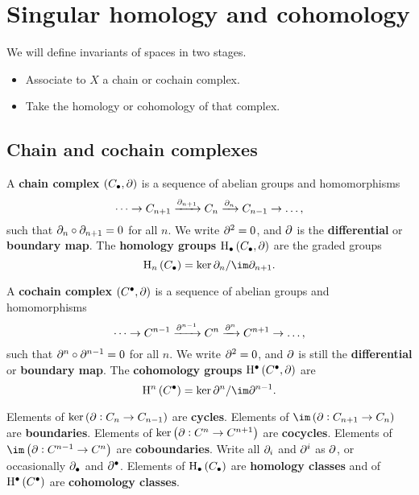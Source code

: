 \pagebreak

\section{Singular homology and cohomology}


We will define invariants of spaces in two stages.
\begin{itemize}
\item Associate to $ X $ a chain or cochain complex.
\item Take the homology or cohomology of that complex.
\end{itemize}

\subsection{Chain and cochain complexes}

\begin{definition*}
A \textbf{chain complex} $ \br{C_\bullet, \da} $ is a sequence of abelian groups and homomorphisms
$$ \dots \to C_{n + 1} \xrightarrow{\partial_{n + 1}} C_n \xrightarrow{\partial_n} C_{n - 1} \to \dots, $$
such that $ \partial_n \circ \partial_{n + 1} = 0 $ for all $ n $. We write $ \partial^2 = 0 $, and $ \partial $ is the \textbf{differential} or \textbf{boundary map}. The \textbf{homology groups} $ \H_\bullet\br{C_\bullet, \da} $ are the graded groups
$$ \H_n\br{C_\bullet} = \ker \da_n / \im \da_{n + 1}. $$
\end{definition*}

\begin{definition*}
A \textbf{cochain complex} $ \br{C^\bullet, \da} $ is a sequence of abelian groups and homomorphisms
$$ \dots \to C^{n - 1} \xrightarrow{\partial^{n - 1}} C^n \xrightarrow{\partial^n} C^{n + 1} \to \dots, $$
such that $ \partial^n \circ \partial^{n - 1} = 0 $ for all $ n $. We write $ \partial^2 = 0 $, and $ \partial $ is still the \textbf{differential} or \textbf{boundary map}. The \textbf{cohomology groups} $ \H^\bullet\br{C^\bullet, \da} $ are
$$ \H^n\br{C^\bullet} = \ker \da^n / \im \da^{n - 1}. $$
\end{definition*}

Elements of $ \ker \br{\da : C_n \to C_{n - 1}} $ are \textbf{cycles}. Elements of $ \im \br{\da : C_{n + 1} \to C_n} $ are \textbf{boundaries}. Elements of $ \ker \br{\da : C^n \to C^{n + 1}} $ are \textbf{cocycles}. Elements of $ \im \br{\da : C^{n - 1} \to C^n} $ are \textbf{coboundaries}. Write all $ \partial_i $ and $ \partial^i $ as $ \partial $, or occasionally $ \partial_\bullet $ and $ \partial^\bullet $. Elements of $ \H_\bullet\br{C_\bullet} $ are \textbf{homology classes} and of $ \H^\bullet\br{C^\bullet} $ are \textbf{cohomology classes}.

